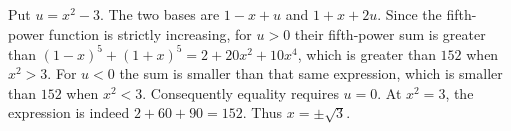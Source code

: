 Put $u=x^2-3$. The two bases are $1-x+u$ and $1+x+2u$. Since the fifth-power function is strictly increasing, for $u>0$ their fifth-power sum is greater than $(1-x)^5+(1+x)^5=2+20x^2+10x^4$, which is greater than $152$ when $x^2>3$. For $u<0$ the sum is smaller than that same expression, which is smaller than $152$ when $x^2<3$. Consequently equality requires $u=0$. At $x^2=3$, the expression is indeed $2+60+90=152$. Thus $\boxed{x=\pm\sqrt3}$.
